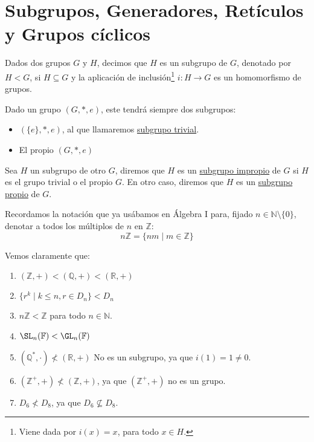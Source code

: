 \chapter{Subgrupos, Generadores, Retículos y Grupos cíclicos}
\begin{definicion}[Subgrupo]
    Dados dos grupos $G$ y $H$, decimos que $H$ es un subgrupo de $G$, denotado por $H < G$, si $H\subseteq G$ y la aplicación de inclusión\footnote{Viene dada por $i(x) = x$, para todo $x\in H$.} $i:H\to G$ es un homomorfismo de grupos.
\end{definicion}

\begin{observacion}
    Dado un grupo $(G,\ast,e)$, este tendrá siempre dos subgrupos:
    \begin{itemize}
        \item $(\{e\},\ast,e)$, al que llamaremos \underline{subgrupo trivial}.
        \item El propio $(G, \ast, e)$
    \end{itemize}
\end{observacion}

\begin{definicion}
    Sea $H$ un subgrupo de otro $G$, diremos que $H$ es un \underline{subgrupo impropio} de $G$ si $H$ es el grupo trivial o el propio $G$. En otro caso, diremos que $H$ es un \underline{subgrupo propio} de $G$.
\end{definicion}

\begin{notacion}
    Recordamos la notación que ya usábamos en Álgebra I para, fijado $n\in \mathbb{N}\setminus\{0\}$, denotar a todos los múltiplos de $n$ en $\mathbb{Z}$:
    \begin{equation*}
        n\mathbb{Z} = \{nm \mid m\in \mathbb{Z}\}
    \end{equation*}
\end{notacion}

\begin{ejemplo}
    Vemos claramente que:
    \begin{enumerate}
        \item $(\mathbb{Z},+) < (\mathbb{Q},+) < (\mathbb{R}, +)$
        \item $\{r^k \mid k\leq n, r\in D_n\} < D_n$ 
        \item $n\mathbb{Z} < \mathbb{Z}$ para todo $n\in \mathbb{N}$.
        \item $\SL_n(\mathbb{F}) < \GL_n(\mathbb{F})$
        \item $(\mathbb{Q}^\ast, \cdot) \not< (\mathbb{R}, +)$ No es un subgrupo, ya que $i(1) = 1 \neq 0$.
        \item $(\mathbb{Z}^+, +) \not< (\mathbb{Z}, +)$, ya que $(\mathbb{Z}^+, +)$ no es un grupo.
        \item $D_6 \not< D_8$, ya que $D_6\nsubseteq D_8$.
    \end{enumerate}
\end{ejemplo}

